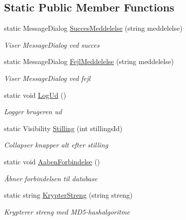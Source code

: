 \subsection*{Static Public Member Functions}
\begin{DoxyCompactItemize}
\item 
static Message\+Dialog \hyperlink{class__1aarsproeve_1_1_model_1_1_hjaelpeklasse_a8f4a1aa7e7237e9031e3be2c784d7960}{Succes\+Meddelelse} (string meddelelse)
\begin{DoxyCompactList}\small\item\em Viser Message\+Dialog ved succes \end{DoxyCompactList}\item 
static Message\+Dialog \hyperlink{class__1aarsproeve_1_1_model_1_1_hjaelpeklasse_ace57d950f0b7031ee1f46f20161e1414}{Fejl\+Meddelelse} (string meddelelse)
\begin{DoxyCompactList}\small\item\em Viser Message\+Dialog ved fejl \end{DoxyCompactList}\item 
static void \hyperlink{class__1aarsproeve_1_1_model_1_1_hjaelpeklasse_a8f05d3f7925d92a44a9d51aa7ff1de82}{Log\+Ud} ()
\begin{DoxyCompactList}\small\item\em Logger brugeren ud \end{DoxyCompactList}\item 
static Visibility \hyperlink{class__1aarsproeve_1_1_model_1_1_hjaelpeklasse_a42829bdb84cba176713783f7b872fe20}{Stilling} (int stillings\+Id)
\begin{DoxyCompactList}\small\item\em Collapser knapper alt efter stilling \end{DoxyCompactList}\item 
static void \hyperlink{class__1aarsproeve_1_1_model_1_1_hjaelpeklasse_a31719b8c5e71226f7a2ceb363d5243b4}{Aaben\+Forbindelse} ()
\begin{DoxyCompactList}\small\item\em Åbner forbindelsen til database \end{DoxyCompactList}\item 
static string \hyperlink{class__1aarsproeve_1_1_model_1_1_hjaelpeklasse_ac29b11d41bd7644ebc33170af54667e6}{Krypter\+Streng} (string streng)
\begin{DoxyCompactList}\small\item\em Krypterer streng med M\+D5-\/hashalgoritme \end{DoxyCompactList}\end{DoxyCompactItemize}
